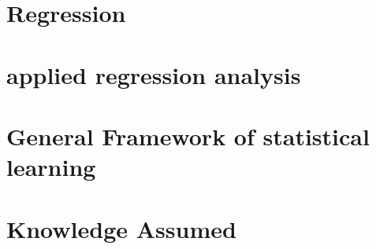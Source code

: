 \documentclass[11pt]{article}
\begin{document}
\blindtext

\section{Regression}\label{sec:Regression}


\blindtext

\section{applied regression analysis}\label{sec:applied regression analysis}

\blindtext

\section{General Framework of statistical learning}\label{sec:General-framework-of-statistical-learning}

\blindtext

\section{Knowledge Assumed}\label{sec:Knowledge-Assumed}

\blindtext
\end{document}
